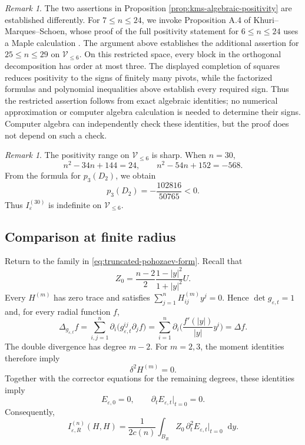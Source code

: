 \documentclass[11pt]{article}
\numberwithin{equation}{section}
\theoremstyle{remark}
\newtheorem{remark}[theorem]{Remark}
\newcommand{\dd}{\mathop{}\!\mathrm{d}}
\begin{document}
\begin{remark}\label{rem:degree-six-exact-algebra}
The two assertions in Proposition  \ref{prop:kms-algebraic-positivity}
are established differently. For \(7\le n\le24\), we invoke
Proposition  A.4 of Khuri--Marques--Schoen, whose proof of the full
positivity statement for \(6\le n\le24\) uses a Maple calculation \cite{KMS}. The argument above establishes
the additional assertion for \(25\le n\le29\) on
\(\mathcal V_{\le6}\). On this restricted space, every block in the
orthogonal decomposition has order at most three. The displayed
completion of squares reduces positivity to the signs of finitely many
pivots, while the factorized formulas and polynomial inequalities above
establish every required sign. Thus the restricted assertion follows
from exact algebraic identities; no numerical approximation or computer
algebra calculation is needed to determine their signs. Computer algebra
can independently check these identities, but the proof does not depend
on such a check.
\end{remark}

\begin{remark}
The positivity range on $\mathcal V_{\le6}$ is sharp. When $n=30$,
{
\begin{equation*}
 n^2-34n+144=24,
 \qquad
 n^2-54n+152=-568.
\end{equation*}
}
 {From the formula for $p_3(D_2)$, we obtain}
{
\[
 p_3(D_2)=-\frac{102816}{50765}<0.
\]
}
Thus $I_\varepsilon^{(30)}$ is indefinite on $\mathcal V_{\le6}$.
\end{remark}

\subsection*{Comparison at finite radius}

Return to the family in \eqref{eq:truncated-pohozaev-form}. Recall that
{
\[
 Z_0=\frac{n-2}{2}\frac{1-|y|^2}{1+|y|^2}U.
\]
}
Every $H^{(m)}$ has  zero trace and satisfies
$\sum_{j=1}^nH_{ij}^{(m)}y^j=0$.  Hence
$\det g_{\varepsilon,t}=1$ and, for every radial function $f$,
{
\[
 \Delta_{g_{\varepsilon,t}}f
 =\sum_{i,j=1}^n\partial_i
 \bigl(g_{\varepsilon,t}^{ij}\partial_jf\bigr)
 =\sum_{i=1}^n\partial_i\biggl(\frac{f'(|y|)}{|y|}y^i\biggr)
 =\Delta f.
\]
}
The double divergence has degree $m-2$.  For $m=2,3$, the  moment
identities therefore imply
{
\[
 \delta^2H^{(m)}=0.
\]
}
Together with the corrector equations for the
remaining degrees, these identities imply
{
\[
 E_{\varepsilon,0}=0,
 \qquad
 \partial_tE_{\varepsilon,t}\big|_{t=0}=0.
\]
}
Consequently,
{
\begin{equation*}
 I_{\varepsilon,R}^{(n)}(H,H)
 =\frac{1}{2c(n)}\int_{B_R}
 Z_0\,\partial_t^2E_{\varepsilon,t}\big|_{t=0}\dd y.
\end{equation*}
}
\end{document}
